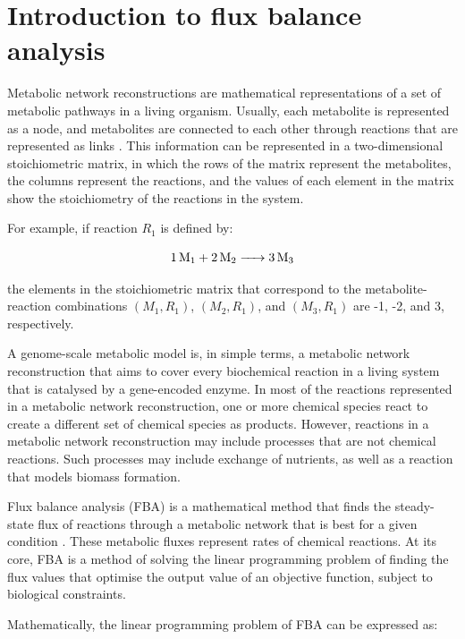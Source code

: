 \section{Introduction to flux balance analysis}
\label{sec:model-fba}

Metabolic network reconstructions are mathematical representations of a set of metabolic pathways in a living organism.
Usually, each metabolite is represented as a node, and metabolites are connected to each other through reactions that are represented as links \parencite{palssonSystemsBiologyConstraintbased2015}.
This information can be represented in a two-dimensional stoichiometric matrix, in which the rows of the matrix represent the metabolites, the columns represent the reactions, and the values of each element in the matrix show the stoichiometry of the reactions in the system.

For example, if reaction $R_{1}$ is defined by:

\begin{equation}
  \ce{1 M1 + 2 M2 -> 3 M3}
  \label{eq:model-example-chemical-reaction}
\end{equation}

the elements in the stoichiometric matrix that correspond to the metabolite-reaction combinations $(M_{1}, R_{1})$, $(M_{2}, R_{1})$, and $(M_{3}, R_{1})$ are -1, -2, and 3, respectively.

A genome-scale metabolic model is, in simple terms, a metabolic network reconstruction that aims to cover every biochemical reaction in a living system that is catalysed by a gene-encoded enzyme.
In most of the reactions represented in a metabolic network reconstruction, one or more chemical species react to create a different set of chemical species as products.
However, reactions in a metabolic network reconstruction may include processes that are not chemical reactions.
Such processes may include exchange of nutrients, as well as a reaction that models biomass formation.

Flux balance analysis (FBA) is a mathematical method that finds the steady-state flux of reactions through a metabolic network that is best for a given condition \parencite{orthWhatFluxBalance2010}.
These metabolic fluxes represent rates of chemical reactions.
At its core, FBA is a method of solving the linear programming problem of finding the flux values that optimise the output value of an objective function, subject to biological constraints.

Mathematically, the linear programming problem of FBA can be expressed as:

